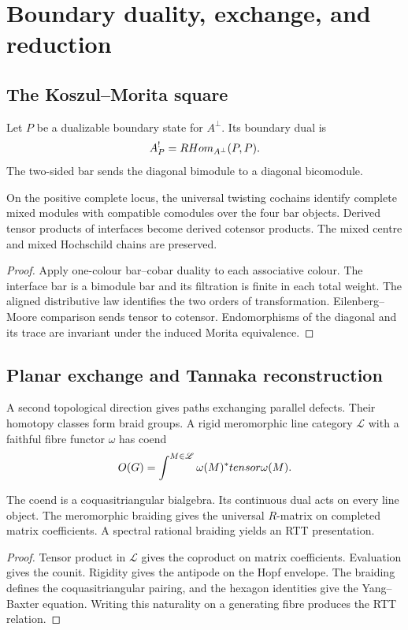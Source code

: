 \part{Boundary duality, exchange, and reduction}

\chapter{The Koszul--Morita square}
Let $P$ be a dualizable boundary state for $A^\perp$.  Its boundary dual is
\[
 A_P^!=RHom_{A^\perp}(P,P).
\]
The two-sided bar sends the diagonal bimodule to a diagonal bicomodule.

\begin{theorem}
On the positive complete locus, the universal twisting cochains identify complete mixed modules with compatible comodules over the four bar objects.  Derived tensor products of interfaces become derived cotensor products.  The mixed centre and mixed Hochschild chains are preserved.
\end{theorem}
\begin{proof}
Apply one-colour bar--cobar duality to each associative colour.  The interface bar is a bimodule bar and its filtration is finite in each total weight.  The aligned distributive law identifies the two orders of transformation.  Eilenberg--Moore comparison sends tensor to cotensor.  Endomorphisms of the diagonal and its trace are invariant under the induced Morita equivalence.
\end{proof}

\chapter{Planar exchange and Tannaka reconstruction}
A second topological direction gives paths exchanging parallel defects.  Their homotopy classes form braid groups.  A rigid meromorphic line category $\mathscr L$ with a faithful fibre functor $\omega$ has coend
\[
 O(G)=\int^{M\in\mathscr L}\omega(M)^*tensor\omega(M).
\]

\begin{theorem}
The coend is a coquasitriangular bialgebra.  Its continuous dual acts on every line object.  The meromorphic braiding gives the universal $R$-matrix on completed matrix coefficients.  A spectral rational braiding yields an RTT presentation.
\end{theorem}
\begin{proof}
Tensor product in $\mathscr L$ gives the coproduct on matrix coefficients.  Evaluation gives the counit.  Rigidity gives the antipode on the Hopf envelope.  The braiding defines the coquasitriangular pairing, and the hexagon identities give the Yang--Baxter equation.  Writing this naturality on a generating fibre produces the RTT relation.
\end{proof}

